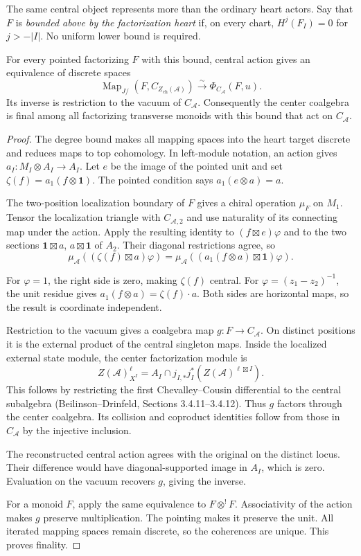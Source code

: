 The same central
object represents
more than the
ordinary heart
actors. Say
that $F$ is
\emph{bounded above
by the factorization
heart} if, on
every chart,
$H^j(F_I)=0$
for $j>-|I|$.
No uniform lower
bound is required.

\begin{theorem}\label{v4-arith:centers:thm:below-heart}
For every pointed
factorizing $F$
with this bound,
central action
gives an equivalence
of discrete spaces
\[
 \operatorname{Map}_{J/}
       (F,C_{Z_{\mathrm{ch}}(\mathcal A)})
 \xrightarrow{\sim}\Phi_{C_{\mathcal A}}(F,u).
\]
Its inverse is
restriction to
the vacuum of
$C_{\mathcal A}$.
Consequently the
center coalgebra
is final among
all factorizing
transverse monoids
with this bound
that act on
$C_{\mathcal A}$.
\end{theorem}

\begin{proof}
The degree bound
makes all mapping
spaces into the
heart target
discrete and
reduces maps to
top cohomology.
In left-module
notation, an
action gives
$a_I:M_I\otimes A_I\to A_I$.
Let $e$ be
the image of
the pointed unit
and set
$\zeta(f)=a_1(f\otimes\mathbf1)$.
The pointed
condition says
$a_1(e\otimes a)=a$.

The two-position
localization boundary
of $F$ gives
a chiral operation
$\mu_F$ on
$M_1$.
Tensor the
localization triangle
with $C_{\mathcal A,2}$
and use naturality
of its connecting
map under the
action.
Apply the resulting
identity to
$(f\boxtimes e)\varphi$
and to the
two sections
$\mathbf1\boxtimes a$,
$a\boxtimes\mathbf1$
of $A_2$.
Their diagonal
restrictions agree,
so
\[
 \mu_{\mathcal A}
       ((\zeta(f)\boxtimes a)\varphi)
 =
 \mu_{\mathcal A}
       ((a_1(f\otimes a)\boxtimes\mathbf1)\varphi).
\]

For $\varphi=1$,
the right side
is zero, making
$\zeta(f)$ central.
For
$\varphi=(z_1-z_2)^{-1}$,
the unit residue
gives
$a_1(f\otimes a)=\zeta(f)\cdot a$.
Both sides are
horizontal maps,
so the result
is coordinate
independent.

Restriction to
the vacuum gives
a coalgebra map
$g:F\to C_{\mathcal A}$.
On distinct
positions it
is the external
product of the
central singleton
maps.
Inside the
localized external
state module,
the center
factorization
module is
\[
 Z(\mathcal A)^\ell_{X^I}
 =
 A_I\cap j_{I,*}j_I^*
       (Z(\mathcal A)^{\ell\boxtimes I}).
\]
This follows by
restricting the
first Chevalley--Cousin
differential to
the central
subalgebra
(Beilinson--Drinfeld,
Sections 3.4.11--3.4.12).
Thus $g$
factors through
the center
coalgebra.
Its collision
and coproduct
identities follow
from those in
$C_{\mathcal A}$
by the injective
inclusion.

The reconstructed
central action
agrees with the
original on the
distinct locus.
Their difference
would have
diagonal-supported
image in $A_I$,
which is zero.
Evaluation on
the vacuum
recovers $g$,
giving the
inverse.

For a monoid
$F$, apply the
same equivalence
to $F\otimes^!F$.
Associativity of
the action makes
$g$ preserve
multiplication.
The pointing
makes it preserve
the unit.
All iterated
mapping spaces
remain discrete,
so the coherences
are unique.
This proves
finality.
\end{proof}

